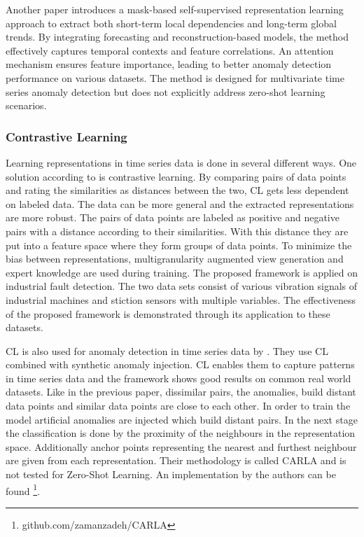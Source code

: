 Another paper introduces a mask-based self-supervised representation learning approach to extract both short-term local dependencies and long-term global trends. By integrating forecasting and reconstruction-based models, the method effectively captures temporal contexts and feature correlations. An attention mechanism ensures feature importance, leading to better anomaly detection performance on various datasets. The method is designed for multivariate time series anomaly detection but does not explicitly address zero-shot learning scenarios.
\cite{miao_unsupervised_2022}

\subsubsection{Contrastive Learning}
Learning representations in time series data is done in several different ways. One solution according to \cite{zhang_debiased_2024} is contrastive learning. By comparing pairs of data points and rating the similarities as distances between the two, CL gets less dependent on labeled data. The data can be more general and the extracted representations are more robust. The pairs of data points are labeled as positive and negative pairs with a distance according to their similarities. With this distance they are put into a feature space where they form groups of data points. To minimize the bias between representations, multigranularity augmented view generation and expert knowledge are used during training. The proposed framework is applied on industrial fault detection. The two data sets consist of various vibration signals of industrial machines and stiction sensors with multiple variables. The effectiveness of the proposed framework is demonstrated through its application to these datasets.

CL is also used for anomaly detection in time series data by \cite{darban_carla_2024}. They use CL combined with synthetic anomaly injection. CL enables them to capture patterns in time series data and the framework shows good results on common real world datasets. Like in the previous paper, dissimilar pairs, the anomalies, build distant data points and similar data points are close to each other. In order to train the model artificial anomalies are injected which build distant pairs. In the next stage the classification is done by  the proximity of the neighbours in the representation space. Additionally anchor points representing the nearest and furthest neighbour are given from each representation. Their methodology is called CARLA and is not tested for Zero-Shot Learning. An implementation by the authors can be found \footnote{\fussy\tiny github.com/zamanzadeh/CARLA}.

